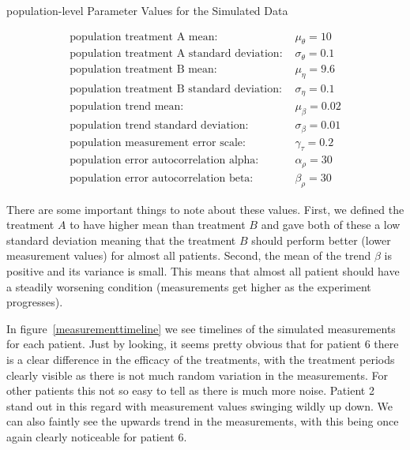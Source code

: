 \documentclass[12pt,a4paper,leqno]{report}
\theoremstyle{plain}
\theoremstyle{definition}
\theoremstyle{remark}
\begin{document}
\begin{table}[H]
    \caption{population-level Parameter Values for the Simulated Data}\label{populationparameters}
    \begin{align}\label{}
        \text{population treatment A mean: } & \mu_{\theta} = 10 \nonumber \\
        \text{population treatment A standard deviation: } & \sigma_{\theta} = 0.1 \nonumber \\
        \text{population treatment B mean: } & \mu_{\eta} = 9.6 \nonumber \\
        \text{population treatment B standard deviation: } & \sigma_{\eta} = 0.1 \nonumber \\
        \text{population trend mean: } & \mu_{\beta} = 0.02 \nonumber \\
        \text{population trend standard deviation: } & \sigma_{\beta} = 0.01 \nonumber \\
        \text{population measurement error scale: } & \gamma_{\tau} = 0.2 \nonumber \\
        \text{population error autocorrelation alpha: } & \alpha_{\rho} = 30 \nonumber \\
        \text{population error autocorrelation beta: } & \beta_{\rho} = 30 \nonumber
    \end{align}
\end{table}

There are some important things to note about these values. First, we defined the
treatment \(A\) to have higher mean than treatment \(B\) and gave both of these a low
standard deviation meaning that the treatment \(B\) should perform better (lower
measurement values) for almost all patients.
Second, the mean of the trend \(\beta \) is positive and its variance is small. This means
that almost all patient should have a steadily worsening condition (measurements get
higher as the experiment progresses).

In figure\ \ref{measurementtimeline} we see timelines of the simulated measurements for each patient. Just by looking, it seems
pretty obvious that for patient 6 there is a clear difference in the efficacy of the
treatments, with the treatment periods clearly visible as there is not much random
variation in the measurements. For other patients this not so
easy to tell as there is much more noise. Patient 2 stand out in this regard with
measurement values swinging wildly up down.  We can also faintly see the upwards trend in the
measurements, with this being once again clearly noticeable for patient 6.
\end{document}
